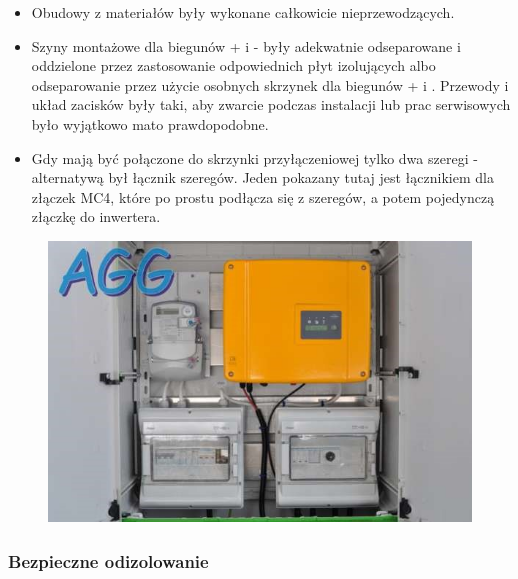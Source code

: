 \documentclass[12pt,a4paper]{article}
\begin{document}
\begin{itemize}
\item Obudowy z materiałów były wykonane całkowicie nieprzewodzących. 
\item Szyny montażowe dla biegunów + i - były adekwatnie 
odseparowane i oddzielone przez zastosowanie odpowiednich płyt izolujących 
albo odseparowanie przez użycie osobnych skrzynek dla biegunów + i . 
Przewody i układ zacisków były taki, aby zwarcie podczas instalacji lub 
prac serwisowych było wyjątkowo mato prawdopodobne. 
\item Gdy mają być połączone do skrzynki przyłączeniowej tylko dwa 
szeregi - alternatywą był łącznik szeregów. Jeden pokazany tutaj jest 
łącznikiem dla złączek MC4, które po prostu podłącza się z szeregów, a 
potem pojedynczą złączkę do inwertera. 
\end{itemize}
 

\begin{figure}[h]
\centering
\includegraphics[natwidth=15.35cm,natheight=10.20cm]{media/image25.jpg}
\end{figure}
 
\subsubsection{Bezpieczne odizolowanie }
\end{document}
